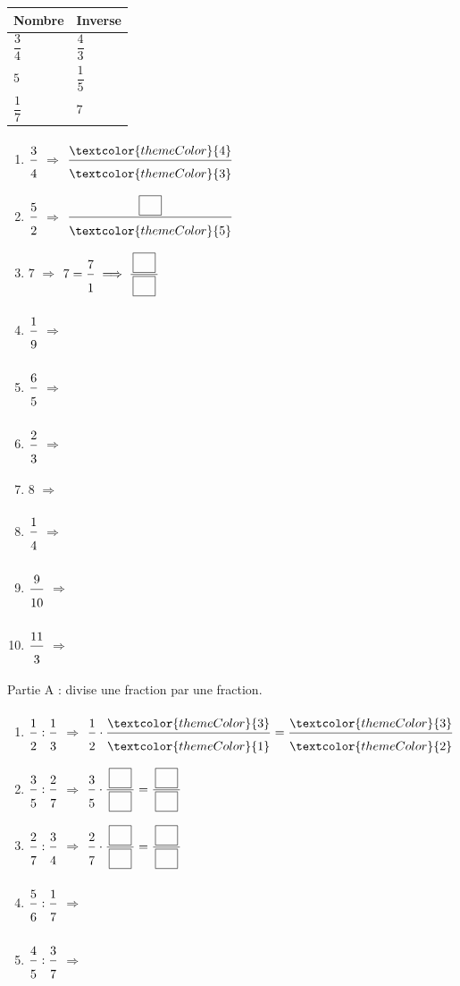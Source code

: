\vspace{20pt}
\def\arraystretch{3}
\begin{tabularx}{\linewidth}{|>{\centering\arraybackslash}X|>{\centering\arraybackslash}X|}
\hline
\cellcolor{themeNO!30}\textbf{Nombre} & \cellcolor{themeNO!30}\textbf{Inverse} \\\hline
$\dfrac{3}{4}$ & $\dfrac{4}{3}$ \\\hline
$5$ & $\dfrac{1}{5}$ \\\hline
$\dfrac{1}{7}$ & $7$ \\\hline
\end{tabularx}
\def\arraystretch{1}


\newpage
{}

\begin{enumerate}[leftmargin=*,align=parleft, label=\alph*), itemsep=9pt]
\item $\FA{3}{4}$ \quad $\Longrightarrow$ \quad $\FA{\textcolor{themeColor}{4}}{\textcolor{themeColor}{3}}$
\item $\FA{5}{2}$ \quad $\Longrightarrow$ \quad $\FA{\CaseC}{\textcolor{themeColor}{5}}$
\item $7$ \quad $\Longrightarrow$ \quad $7=\FA{7}{1}\;\Longrightarrow\;\FA{\CaseC}{\CaseC}$
\item $\FA{1}{9}$ \quad $\Longrightarrow$
\item $\FA{6}{5}$ \quad $\Longrightarrow$
\item $\FA{2}{3}$ \quad $\Longrightarrow$
\item $8$ \quad $\Longrightarrow$
\item $\FA{1}{4}$ \quad $\Longrightarrow$
\item $\FA{9}{10}$ \quad $\Longrightarrow$
\item $\FA{11}{3}$ \quad $\Longrightarrow$
\end{enumerate}

\newpage
{}

\medskip
\textcolor{themeColor}{Partie A} : divise une fraction par une fraction.

\begin{enumerate}[leftmargin=*,align=parleft, label=\alph*), itemsep=9pt]
\item $\FA{1}{2}:\FA{1}{3}$ \quad $\Longrightarrow$ \quad $\FA{1}{2}\cdot\FA{\textcolor{themeColor}{3}}{\textcolor{themeColor}{1}}=\FA{\textcolor{themeColor}{3}}{\textcolor{themeColor}{2}}$
\item $\FA{3}{5}:\FA{2}{7}$ \quad $\Longrightarrow$ \quad $\FA{3}{5}\cdot\FA{\CaseC}{\CaseC}=\FA{\CaseC}{\CaseC}$
\item $\FA{2}{7}:\FA{3}{4}$ \quad $\Longrightarrow$ \quad $\FA{2}{7}\cdot\FA{\CaseC}{\CaseC}=\FA{\CaseC}{\CaseC}$
\item $\FA{5}{6}:\FA{1}{7}$ \quad $\Longrightarrow$
\item $\FA{4}{5}:\FA{3}{7}$ \quad $\Longrightarrow$
\end{enumerate}

